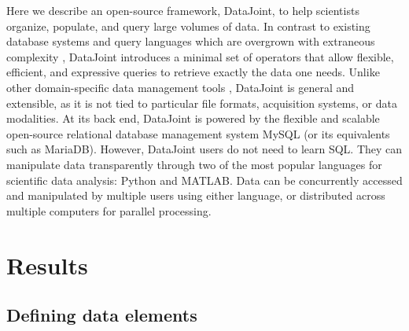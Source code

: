 \documentclass[10pt,letterpaper]{article}
\begin{document}
Here we describe an open-source framework, DataJoint, to help scientists organize, populate, and query large volumes of data.
In contrast to existing database systems and query languages which are overgrown with extraneous complexity \cite{date_sql_2011,manyam_relax_2012},
DataJoint introduces a minimal set of operators that allow flexible, efficient, and expressive queries to retrieve exactly the data one needs.
Unlike other domain-specific data management tools \cite{manyam_relax_2012, gunay_database_2009, schutter_review_2009, small_database-managed_2009, brown_overview_2010, shi_synapticdb_2011, pittendrigh_neurosys_2003}, DataJoint is general and extensible, as it is not tied to particular file formats, acquisition systems, or data modalities.
At its back end, DataJoint is powered by the flexible and scalable open-source relational database management system MySQL (or its equivalents such as MariaDB).
However, DataJoint users do not need to learn SQL. They can manipulate data transparently through two of the most popular languages for scientific data analysis: Python and MATLAB.
Data can be concurrently accessed and manipulated by multiple users using either language, or distributed across multiple computers for parallel processing.

\section*{Results}
\subsection*{Defining data elements}
\end{document}
